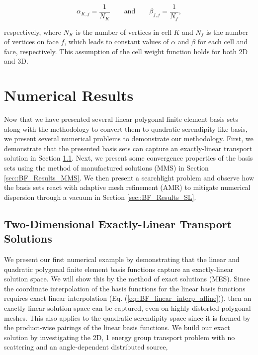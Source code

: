 \begin{equation}
\alpha_{K,j} = \frac{1}{N_K} \qquad \text{and} \qquad \beta_{f,j} = \frac{1}{N_f},
\label{eq::PWL_weight_vals}
\end{equation}

\noindent respectively, where $N_K$ is the number of vertices in cell $K$ and $N_f$ is the number of vertices on face $f$, which leads to constant values of $\alpha$ and $\beta$ for each cell and face, respectively. This assumption of the cell weight function holds for both 2D and 3D.

\section{Numerical Results}
\label{sec::BF_Results}

Now that we have presented several linear polygonal finite element basis sets along with the methodology to convert them to quadratic serendipity-like basis, we present several numerical problems to demonstrate our methodology. First, we demonstrate that the presented basis sets can capture an exactly-linear transport solution in Section \ref{sec::BF_Results_Linear}. Next, we present some convergence properties of the basis sets using the method of manufactured solutions (MMS) in Section \ref{sec::BF_Results_MMS}. We then present a searchlight problem and observe how the basis sets react with adaptive mesh refinement (AMR) to mitigate numerical dispersion through a vacuum in Section \ref{sec::BF_Results_SL}.

\subsection{Two-Dimensional Exactly-Linear Transport Solutions}
\label{sec::BF_Results_Linear}

We present our first numerical example by demonstrating that the linear and quadratic polygonal finite element basis functions capture an exactly-linear solution space. We will show this by the method of exact solutions (MES). Since the coordinate interpolation of the basis functions for the linear basis functions requires exact linear interpolation (Eq. (\ref{eq::BF_linear_interp_affine})), then an exactly-linear solution space can be captured, even on highly distorted polygonal meshes. This also applies to the quadratic serendipity space since it is formed by the product-wise pairings of the linear basis functions. We build our exact solution by investigating the 2D, 1 energy group transport problem with no scattering and an angle-dependent distributed source,

